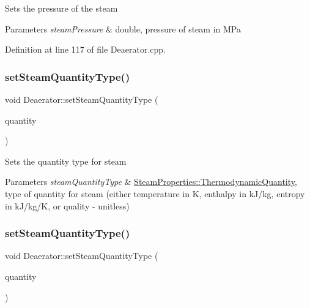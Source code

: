 Sets the pressure of the steam 
\begin{DoxyParams}{Parameters}
{\em steam\+Pressure} & double, pressure of steam in M\+Pa \\
\hline
\end{DoxyParams}


Definition at line 117 of file Deaerator.\+cpp.

\mbox{\label{class_deaerator_a1aa3b3de064d148479af9576e717b6c2}} 
\subsubsection{\texorpdfstring{set\+Steam\+Quantity\+Type()}{setSteamQuantityType()}\hspace{0.1cm}{\footnotesize\ttfamily [1/3]}}
{\footnotesize\ttfamily void Deaerator\+::set\+Steam\+Quantity\+Type (\begin{DoxyParamCaption}\item[{\hyperlink{class_steam_properties_ae0294bedf7d178c2d8fb6aed0f62fbff}{Steam\+Properties\+::\+Thermodynamic\+Quantity}}]{quantity }\end{DoxyParamCaption})}

Sets the quantity type for steam 
\begin{DoxyParams}{Parameters}
{\em steam\+Quantity\+Type} & \hyperlink{class_steam_properties_ae0294bedf7d178c2d8fb6aed0f62fbff}{Steam\+Properties\+::\+Thermodynamic\+Quantity}, type of quantity for steam (either temperature in K, enthalpy in k\+J/kg, entropy in k\+J/kg/K, or quality -\/ unitless) \\
\hline
\end{DoxyParams}
\mbox{\label{class_deaerator_a1aa3b3de064d148479af9576e717b6c2}} 
\subsubsection{\texorpdfstring{set\+Steam\+Quantity\+Type()}{setSteamQuantityType()}\hspace{0.1cm}{\footnotesize\ttfamily [2/3]}}
{\footnotesize\ttfamily void Deaerator\+::set\+Steam\+Quantity\+Type (\begin{DoxyParamCaption}\item[{\hyperlink{class_steam_properties_ae0294bedf7d178c2d8fb6aed0f62fbff}{Steam\+Properties\+::\+Thermodynamic\+Quantity}}]{quantity }\end{DoxyParamCaption})}

